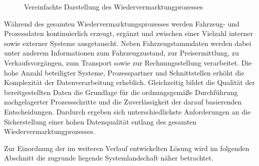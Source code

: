 \documentclass[../main.tex]{subfiles}
\begin{document}
\begin{figure}[htbp]
    \centering


    \caption{Vereinfachte Darstellung des Wiedervermarktungprozesses}
    \label{fig:Wiedervermarktungsprozess}
\end{figure}

Während des gesamten Wiedervermarktungsprozesses werden Fahrzeug- und Prozessdaten kontinuierlich erzeugt, ergänzt und zwischen einer Vielzahl interner sowie externer Systeme ausgetauscht. Neben Fahrzeugstammdaten werden dabei unter anderem Informationen zum Fahrzeugzustand, zur Preisermittlung, zu Verkaufsvorgängen, zum Transport sowie zur Rechnungsstellung verarbeitet. Die hohe Anzahl beteiligter Systeme, Prozesspartner und Schnittstellen erhöht die Komplexität der Datenverarbeitung erheblich. Gleichzeitig bildet die Qualität der bereitgestellten Daten die Grundlage für die ordnungsgemäße Durchführung nachgelagerter Prozessschritte und die Zuverlässigkeit der darauf basierenden Entscheidungen. Dardurch ergeben sich unterschiedlichste Anforderungen an die Sicherstellung einer hohen Datenqualität entlang des gesamten Wiedervermarktungprozesses.

Zur Einordnung der im weiteren Verlauf entwickelten Lösung wird im folgenden Abschnitt die zugrunde liegende Systemlandschaft näher betrachtet.
\end{document}
